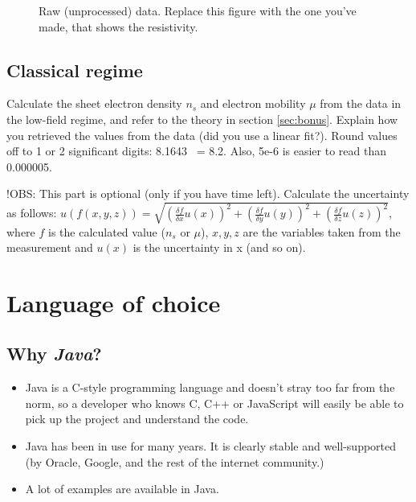 \documentclass[a4paper]{article}
\begin{document}
\begin{figure}
	\centering
	\caption{\label{fig:data}Raw (unprocessed) data. Replace this figure with the one you've made, that shows the resistivity.}
\end{figure}

\subsection{Classical regime}
Calculate the sheet electron density $n_{s}$ and electron mobility $\mu$ from the data in the low-field regime, and refer to the theory in section \ref{sec:bonus}. Explain how you retrieved the values from the data (did you use a linear fit?).
Round values off to 1 or 2 significant digits: 8.1643 ~= 8.2. Also, 5e-6 is easier to read than 0.000005.

!OBS: This part is optional (only if you have time left).
Calculate the uncertainty as follows: \newline $u(f(x, y, z)) = \sqrt{(\frac{\delta f}{\delta{x}} u(x))^{2} + (\frac{\delta f}{\delta{y}} u(y))^{2} + (\frac{\delta f}{\delta{z}} u(z))^{2}}$, where $f$ is the calculated value ($n_{s}$ or $\mu$), $x, y, z$ are the variables taken from the measurement and $u(x)$ is the uncertainty in x (and so on).

\section{Language of choice}
\label{sec:language}


\subsection{Why \emph{Java}?}
\begin{itemize}
	\item Java is a C-style programming language and doesn't stray too far from the norm, so a developer who knows C, C++ or JavaScript will easily be able to pick up the project and understand the code.
	\item Java has been in use for many years. It is clearly stable and well-supported (by Oracle, Google, and the rest of the internet community.)
	\item A lot of examples are available in Java.
\end{itemize}
\end{document}
